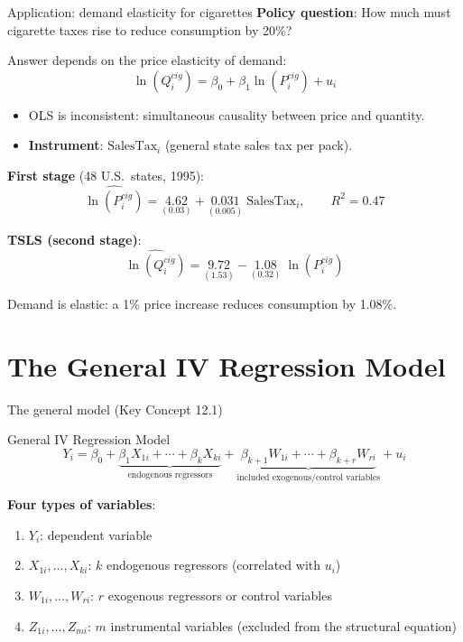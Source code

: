 \documentclass[10pt]{beamer}
\begin{document}
\begin{frame}{Application: demand elasticity for cigarettes}
\label{slide:cigarettes_intro}
\textbf{Policy question}: How much must cigarette taxes rise to reduce consumption by 20\%?

\vspace{0.3em}
Answer depends on the \alert{price elasticity of demand}:
\[
\ln(Q_i^{cig}) = \beta_0 + \beta_1 \ln(P_i^{cig}) + u_i
\]

\pause
\begin{itemize}
  \item OLS is inconsistent: simultaneous causality between price and quantity.
  \item \textbf{Instrument}: $\text{SalesTax}_i$ (general state sales tax per pack).
\end{itemize}

\pause
\textbf{First stage} (48 U.S.\ states, 1995):
\[
\widehat{\ln(P_i^{cig})} = \underset{(0.03)}{4.62} + \underset{(0.005)}{0.031}\;\text{SalesTax}_i, \qquad R^2 = 0.47
\]

\textbf{TSLS (second stage)}:
\[
\widehat{\ln(Q_i^{cig})} = \underset{(1.53)}{9.72} - \underset{(0.32)}{1.08}\;\ln(P_i^{cig})
\]

Demand is elastic: a 1\% price increase reduces consumption by 1.08\%.
\end{frame}

\section{The General IV Regression Model}

\begin{frame}{The general model (Key Concept 12.1)}
\label{slide:general_model}
\begin{block}{General IV Regression Model}
\vspace{-0.5em}
\begin{equation}
Y_i = \beta_0 + \underbrace{\beta_1 X_{1i} + \cdots + \beta_k X_{ki}}_{\text{endogenous regressors}} + \underbrace{\beta_{k+1}W_{1i} + \cdots + \beta_{k+r}W_{ri}}_{\text{included exogenous/control variables}} + u_i \tag{12.12}
\end{equation}
\end{block}

\textbf{Four types of variables}:
\begin{enumerate}
  \item $Y_i$: dependent variable
  \item $X_{1i}, \ldots, X_{ki}$: $k$ \alert{endogenous} regressors (correlated with $u_i$)
  \item $W_{1i}, \ldots, W_{ri}$: $r$ \alert{exogenous} regressors or control variables
  \item $Z_{1i}, \ldots, Z_{mi}$: $m$ \alert{instrumental variables} (excluded from the structural equation)
\end{enumerate}
\end{frame}
\end{document}
